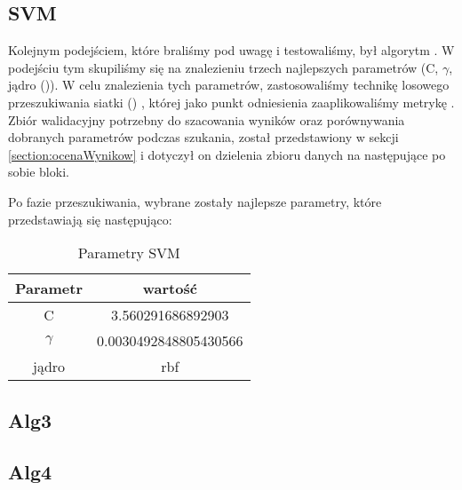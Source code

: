         \subsection{SVM}
        Kolejnym podejściem, które braliśmy pod uwagę i testowaliśmy, był algorytm . W podejściu tym skupiliśmy się na znalezieniu trzech najlepszych parametrów (C, $\gamma$, jądro ()). W celu znalezienia tych parametrów, zastosowaliśmy technikę losowego przeszukiwania siatki () \cite{SKcv}, której jako punkt odniesienia zaaplikowaliśmy metrykę  \cite{SKf1}. Zbiór walidacyjny potrzebny do szacowania wyników oraz porównywania dobranych parametrów podczas szukania, został przedstawiony w sekcji \ref{section:ocenaWynikow} i dotyczył on dzielenia zbioru danych na następujące po sobie bloki.
        
        Po fazie przeszukiwania, wybrane zostały najlepsze parametry, które przedstawiają się następująco:
        \begin{table}[H]
            \centering
             \caption{Parametry SVM}
            \label{tab:my_label}
            \begin{tabular}{| c c |}
            \hline
                 Parametr & wartość \\ \hline \hline
                 C & 3.560291686892903 \\ \hline
                 $\gamma$ & 0.0030492848805430566 \\ \hline
                 jądro & rbf \\ \hline
            \end{tabular}
        \end{table}
        \subsection{Alg3}
        \subsection{Alg4}